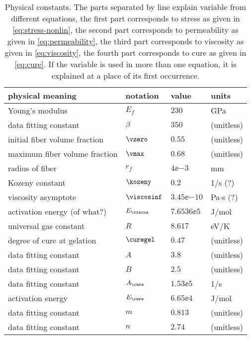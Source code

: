 \documentclass[twoside,a4paper,12pt]{article}
\newcommand{\note}[1]{{\color{red}(#1)}}
\newcommand{\QM}{{\color{red}(?)}}
\newcommand{\note}[1]{}
\newcommand{\QM}{}
\begin{document}
\begin{table}[t]
  \centering
  \begin{tabular}{llll}
    \toprule
    physical meaning & notation & value & units \\
    \midrule
    Young's modulus               & $E_f$        & $230$         & GPa            \\ 
    data fitting constant         & $\beta$      & $350$         & (unitless)            \\
    initial fiber volume fraction & $\vzero$        & $0.55$        & (unitless)     \\
    maximum fiber volume fraction & $\vmax$        & $0.68$        & (unitless)     \\
    \midrule
    radius of fiber               & $r_f$        & $4\ee{-3}$    & mm             \\
    Kozeny constant              & $\kozeny$          & $0.2$         & 1/s \QM            \\
    \midrule
    viscosity asymptote     & $\viscosinf$ & $3.45\ee{-10}$ & Pa$\cdot$s \QM \\ 
    activation energy \note{of what?}    & $E_\viscos$ & $7.6536\ee{5}$& J/mol\\
    universal gas constant        & $R$          & $8.617$       & eV/K           \\
    degree of cure at  gelation   & $\curegel$   & $0.47$        & (unitless)            \\ 
    data fitting constant        &$A$ & $3.8$&(unitless)\\
    data fitting constant        &$B$ & $2.5$&(unitless)\\
    \midrule
     data fitting constant             &$A_\cure$&$1.53\ee{5}$& 1/s \\
     activation energy             &$E_\cure$& $6.65\ee{4}$  & J/mol          \\
     data fitting constant             &$m$&$0.813$& (unitless) \\
     data fitting constant             &$n$&$2.74$& (unitless) \\
    \bottomrule
  \end{tabular}
  \caption{Physical constants. The parts separated by line explain variable from different equations, the first part corresponds to stress as given in \eqref{eq:stress-nonlin}, the second part corresponds to permeability as given in \eqref{eq:permeability}, the third part corresponds to viscosity as given in \eqref{eq:viscosity}, the fourth part corresponds to cure as given in \eqref{eq:cure}. If the variable is used in more than one equation, it is explained at a place of its first occurrence.}
  \label{tab:phys-const}
\end{table}
\end{document}
